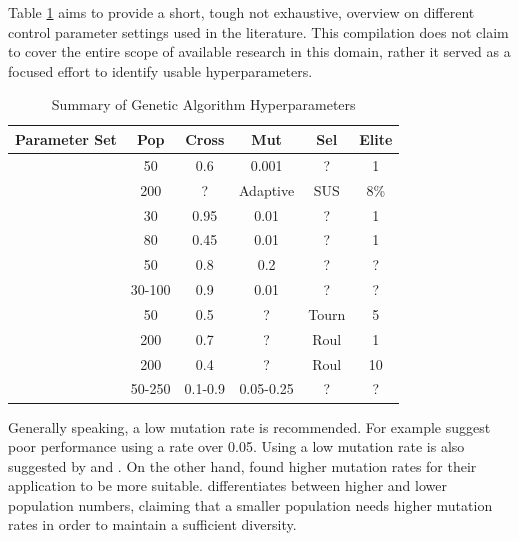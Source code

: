 Table \ref{tab:hyperparameter_tuning:ga_hyperparameters} aims to provide a short, tough not exhaustive, overview on different control parameter settings used in the literature. This compilation does not claim to cover the entire scope of available research in this domain, rather it served as a focused effort to identify usable hyperparameters.

\begin{table}[ht]
	\centering
	\caption{Summary of Genetic Algorithm Hyperparameters}
	\label{tab:hyperparameter_tuning:ga_hyperparameters}
	\begin{tabular}{lccccc}
		\hline
		\textbf{Parameter Set} & \textbf{Pop} & \textbf{Cross} & \textbf{Mut} & \textbf{Sel} & \textbf{Elite} \\
		\hline
		\cite{de_jong_analysis_1975} & 50 & 0.6 & 0.001 & ? & 1 \\
		\cite{mills_determining_2015} & 200 & ? & Adaptive & SUS & 8\% \\
		\cite{grefenstette_optimization_1986} & 30 & 0.95 & 0.01 & ? & 1 \\
		\cite{grefenstette_optimization_1986} & 80 & 0.45 & 0.01 & ? & 1 \\
		\cite{almanee_scenorita_2021} & 50 & 0.8 & 0.2 & ? & ? \\
		\cite{srinivas_genetic_1994}  & 30-100 & 0.9 & 0.01 & ? & ? \\
		\cite{fazal_estimating_2005} & 50 & 0.5 & ? & Tourn & 5 \\
		\cite{dao_maximising_2016} & 200 & 0.7 & ? & Roul & 1 \\
		\cite{naruka_parameter_2019} & 200 & 0.4 & ? & Roul & 10 \\
		\cite{jinghui_zhong_comparison_2005} & 50-250 & 0.1-0.9 & 0.05-0.25 & ? & ? \\
		\hline
	\end{tabular}
\end{table}

Generally speaking, a low mutation rate is recommended. For example \cite{grefenstette_optimization_1986} suggest poor performance using a rate over 0.05. Using a low mutation rate is also suggested by \cite{whitley_genetic_1994} and \cite{jinghui_zhong_comparison_2005}. On the other hand, \cite{boyabatli_parameter_2004} found higher mutation rates for their application to be more suitable. \cite{srinivas_genetic_1994} differentiates between higher and lower population numbers, claiming that a smaller population needs higher mutation rates in order to maintain a sufficient diversity.

